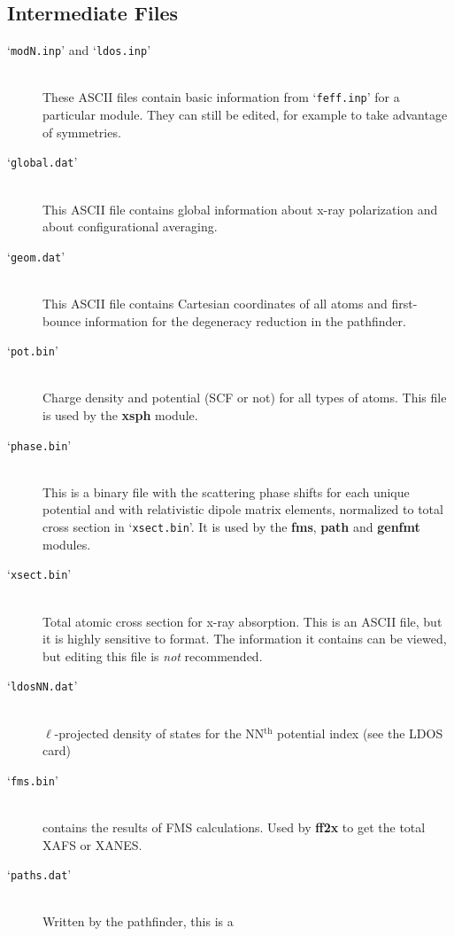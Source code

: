 \documentclass[11pt,oneside]{report} %
\renewcommand{\htmlref}[2]{\hyperlink{#2}{#1}}
\newcommand{\file}[1]{`\texttt{#1}'}
\newcommand{\module}[1]{\textrm{\bf{#1}}}
\renewcommand{\htmlref}[2]{{#1}} %
\begin{document}
\begin{latexonly}
\subsection{Intermediate Files}
\label{sec:Interm-Files}

\begin{description}
\item[\file{modN.inp} and \file{ldos.inp}]\hfill\\ These ASCII files contain
   basic information 
  from \file{feff.inp} for a particular module. They can still be edited,
  for example to take advantage of symmetries.
\item[\file{global.dat} ]\hfill\\ This ASCII file contains
   global information  about x-ray polarization and about
   configurational averaging.
\item[\file{geom.dat} ]\hfill\\ This ASCII file contains
   Cartesian coordinates of all atoms and first-bounce information 
   for the  degeneracy reduction in the pathfinder.
\item[\file{pot.bin}]\hfill\\ Charge density and potential (SCF or not) for
  all types of atoms. This file is used by the \module{xsph} module.
\item[\file{phase.bin}]\hfill\\ This is a binary file with the scattering
  phase shifts for each unique potential and with relativistic dipole matrix
  elements, normalized to total cross section in \file{xsect.bin}.
  It is used by the \module{fms}, \module{path} and \module{genfmt} modules.
\item[\file{xsect.bin}]\hfill\\ Total atomic cross section for x-ray
  absorption. This is an ASCII file, but it is highly sensitive to format. The 
  information it contains can be viewed, but editing this file is \emph{not} 
  recommended.
\item[\file{ldosNN.dat}]\hfill\\ $\ell$-projected density of states for the
  NN$^{\mathrm{th}}$ potential index (see the \htmlref{LDOS}{card:ldo} card)
\item[\file{fms.bin}]\hfill\\ contains the results of FMS calculations. Used
  by \module{ff2x} to get the total XAFS or XANES.
\item[\file{paths.dat}]\hfill\\ Written by the pathfinder, this is a

\end{description}
\end{latexonly}
\end{document}
